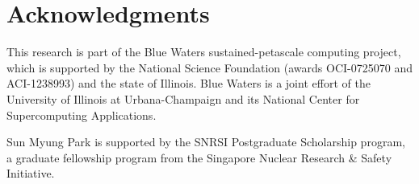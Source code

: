 \section{Acknowledgments}
This research is part of the Blue Waters sustained-petascale computing project,
which is supported by the National Science Foundation (awards OCI-0725070 and
ACI-1238993) and the state of Illinois. Blue Waters is a joint effort of the
University of Illinois at Urbana-Champaign and its National Center for
Supercomputing Applications.

Sun Myung Park is supported by the SNRSI Postgraduate Scholarship program, a
graduate fellowship program from the Singapore Nuclear Research \& Safety
Initiative.
